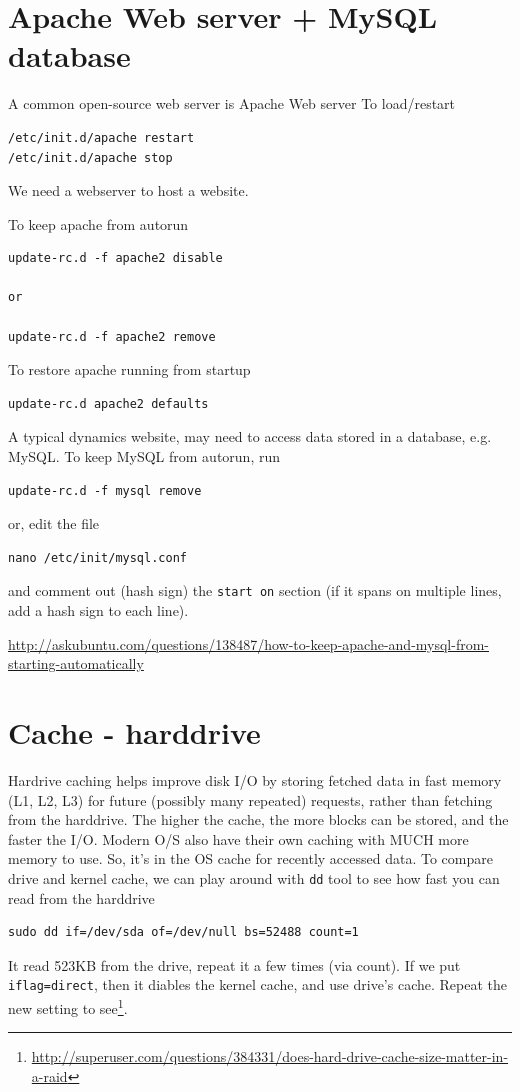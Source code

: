 \section{Apache Web server + MySQL database}

A common open-source web server is Apache Web server
To load/restart
\begin{verbatim}
/etc/init.d/apache restart
/etc/init.d/apache stop
\end{verbatim}
We need a webserver to host a website.

To keep apache from autorun 
\begin{verbatim}
update-rc.d -f apache2 disable

or 

update-rc.d -f apache2 remove
\end{verbatim} 
To restore apache running from startup
\begin{verbatim}
update-rc.d apache2 defaults
\end{verbatim}

A typical dynamics website, may need to access data stored in a database, e.g.
MySQL. To keep MySQL from autorun, run
\begin{verbatim}
update-rc.d -f mysql remove
\end{verbatim}
or, edit the file
\begin{verbatim}
nano /etc/init/mysql.conf
\end{verbatim}
and comment out (hash sign) the \verb!start on! section (if it spans on
multiple lines, add a hash sign to each line).

\url{http://askubuntu.com/questions/138487/how-to-keep-apache-and-mysql-from-starting-automatically}


\section{Cache - harddrive}

Hardrive caching helps improve disk I/O by storing fetched data in fast memory
(L1, L2, L3) for future (possibly many repeated) requests, rather than fetching from the
harddrive. The higher the cache, the more blocks can be stored, and the faster
the I/O. Modern O/S also have their own caching with MUCH more memory to use.
So, it's in the OS cache for recently accessed data. To compare drive and kernel
cache, we can play around with \verb!dd! tool to see how fast you can read from
the harddrive
\begin{verbatim}
sudo dd if=/dev/sda of=/dev/null bs=52488 count=1
\end{verbatim}
It read 523KB from the drive, repeat it a few times (via count). If we put
\verb!iflag=direct!, then it diables the kernel cache, and use drive's cache.
Repeat the new setting to
see\footnote{\url{http://superuser.com/questions/384331/does-hard-drive-cache-size-matter-in-a-raid}}.

